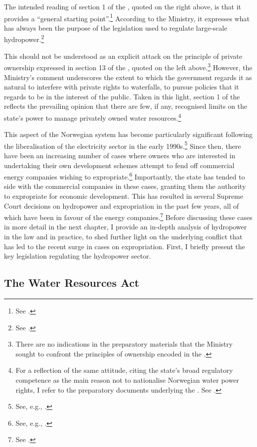 The intended reading of section 1 of the \cite{ica17}, quoted on the right above, is that it provides a ``general starting point''.\footnote{See \cite[72]{otprp61}.} According to the Ministry, it expresses what has always been the purpose of the legislation used to regulate large-scale hydropower.\footnote{See \cite[72]{otprp61}.} 

This should not be understood as an explicit attack on the principle of private ownership expressed in section 13 of the \cite{wra00}, quoted on the left above.\footnote{There are no indications in the preparatory materials that the Ministry sought to confront the principles of ownership encoded in the \cite{wra00}.} However, the Ministry's comment underscores the extent to which the government regards it as natural to interfere with private rights to waterfalls, to pursue policies that it regards to be in the interest of the public. Taken in this light, section 1 of the \cite{ica17} reflects the prevailing opinion that there are few, if any, recognised limits on the state's power to manage privately owned water resources.\footnote{For a reflection of the same attitude, citing the state's broad regulatory competence as the main reason not to nationalise Norwegian water power rights, I refer to the preparatory documents underlying the \cite{wra00}. See \cite[152-153]{nou94}.}

This aspect of the Norwegian system has become particularly significant following the liberalisation of the electricity sector in the early 1990s.\footnote{See, e.g., \cite{larsen06}.} Since then, there have been an increasing number of cases where owners who are interested in undertaking their own development schemes attempt to fend off commercial energy companies wishing to expropriate.\footnote{See, e.g., \cite{sofienlund07}.} Importantly, the state has tended to side with the commercial companies in these cases, granting them the authority to expropriate for economic development. This has resulted in several Supreme Court decisions on hydropower and expropriation in the past few years, all of which have been in favour of the energy companies.\footnote{See  \cite{uleberg08,jorpeland11,klovtveit11,otra13}.} Before discussing these cases in more detail in the next chapter, I provide an in-depth analysis of hydropower in the law and in practice, to shed further light on the underlying conflict that has led to the recent surge in cases on expropriation. First, I briefly present the key legislation regulating the hydropower sector.

\subsection{The Water Resources Act}\label{sec:wra00}


